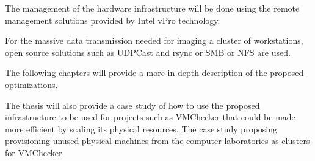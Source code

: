 The management of the hardware infrastructure will be done using the
remote management solutions provided by Intel vPro technology.

For the massive data transmission needed for imaging a cluster of
workstations, open source solutions such as UDPCast and rsync or SMB or
NFS are used.

The following chapters will provide a more in depth description of the
proposed optimizations.

The thesis will also provide a case study of how to use the proposed
infrastructure to be used for projects such as VMChecker that could be
made more efficient by scaling its physical resources. The case study
proposing provisioning unused physical machines from the computer
laboratories as clusters for VMChecker.
